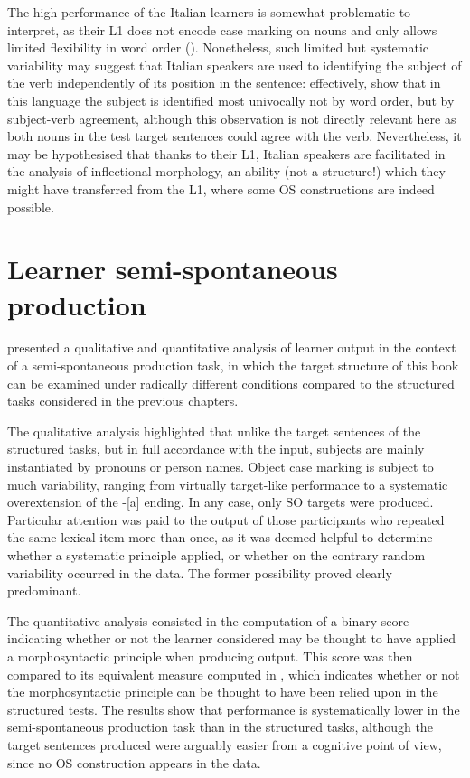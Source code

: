 The high performance of the Italian learners is somewhat problematic to interpret, as their L1 does not encode case marking on nouns and only allows limited flexibility in word order (\citealt{Jezek2003, Jezek2011, Jezek2016}). Nonetheless, such limited but systematic variability may suggest that Italian speakers are used to identifying the subject of the verb independently of its position in the sentence: effectively, \citet{MacWhinneyEtAl1984} show that in this language the subject is identified most univocally not by word order, but by subject-verb agreement, although this observation is not directly relevant here as both nouns in the test target sentences could agree with the verb. Nevertheless, it may be hypothesised that thanks to their L1, Italian speakers are facilitated in the analysis of inflectional morphology, an ability (not a structure!) which they might have transferred from the L1, where some OS constructions are indeed possible.

\section{Learner semi-spontaneous production}\label{sec:08:5}

 presented a qualitative and quantitative analysis of learner output in the context of a semi-spontaneous production task, in which the target structure of this book can be examined under radically different conditions compared to the structured tasks considered in the previous chapters.

The qualitative analysis highlighted that unlike the target sentences of the structured tasks, but in full accordance with the input, subjects are mainly instantiated by pronouns or person names.  Object case marking is subject to much variability, ranging from virtually target-like performance to a systematic overextension of the -[a] ending. In any case, only SO targets were produced. Particular attention was paid to the output of those participants who repeated the same lexical item more than once, as it was deemed helpful to determine whether a systematic principle applied, or whether on the contrary random variability occurred in the data. The former possibility proved clearly predominant.

The quantitative analysis consisted in the computation of a binary score indicating whether or not the learner considered may be thought to have applied a morphosyntactic principle when producing output. This score was then compared to its equivalent measure computed in , which indicates whether or not the morphosyntactic principle can be thought to have been relied upon in the structured tests. The results show that performance is systematically lower in the semi-spontaneous production task than in the structured tasks, although the target sentences produced were arguably easier from a cognitive point of view, since no OS construction appears in the data.

